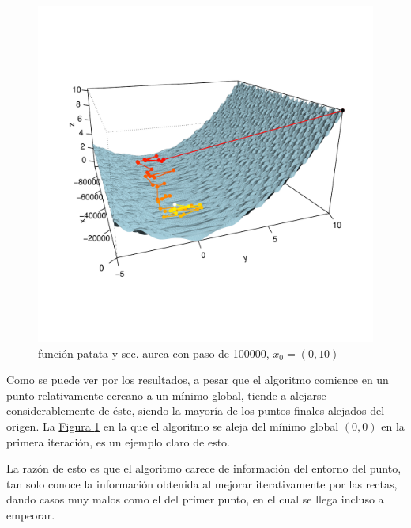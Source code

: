 \begin{figure}
\vspace{-8.6em}\hfill%
\hspace{-6ex}\includegraphics[width=1.2\linewidth]{../theoretic_study/func_patata/R/0,10/plot3.pdf}%
\hfill\hbox{}
\vspace{-8em}
\caption{\small función patata y sec. aurea con paso de 100000, $x_0=(0,10)$} \label{fig:rosen1}
\vspace{-5em}
\end{figure}
Como se puede ver por los resultados, a pesar que el algoritmo comience en un punto relativamente cercano a un mínimo global, tiende a alejarse considerablemente de éste, siendo la mayoría de los puntos finales alejados del origen. La \hyperref[fig:rosen1]{Figura \ref*{fig:rosen1}} en la que el algoritmo se aleja del mínimo global $(0,0)$ en la primera iteración, es un ejemplo claro de esto.

La razón de esto es que el algoritmo carece de información del entorno del punto, tan solo conoce la información obtenida al mejorar iterativamente por las rectas, dando casos muy malos como el del primer punto, en el cual se llega incluso a empeorar. 
\newpage

